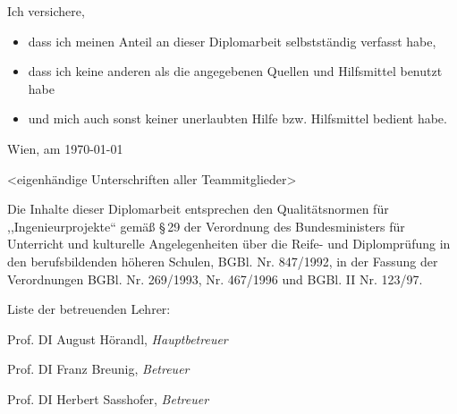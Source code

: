 \documentclass[a4paper,ngerman,naustrian,DIV=12,BCOR=1cm]{scrbook}
\begin{document}

\thispagestyle{fancy}





\thispagestyle{fancy}





\thispagestyle{fancy}

Ich versichere, 
\begin{itemize}
\item dass ich meinen Anteil an dieser Diplomarbeit selbstständig verfasst
habe, 
\item dass ich keine anderen als die angegebenen Quellen und Hilfsmittel
benutzt habe 
\item und mich auch sonst keiner unerlaubten Hilfe bzw. Hilfsmittel bedient
habe.
\end{itemize}
\bigskip{}
Wien, am \today

<eigenhändige Unterschriften aller Teammitglieder>



\thispagestyle{fancy}

Die Inhalte dieser Diplomarbeit entsprechen den Qualitätsnormen für
,,Ingenieurprojekte`` gemäß §\,29 der Verordnung des Bundesministers
für Unterricht und kulturelle Angelegenheiten über die Reife- und
Diplomprüfung in den berufsbildenden höheren Schulen, BGBl. Nr. 847/1992,
in der Fassung der Verordnungen BGBl. Nr. 269/1993, Nr. 467/1996 und
BGBl. II Nr. 123/97.

\vspace{10mm}


Liste der betreuenden Lehrer: 

Prof. DI August Hörandl, \textit{Hauptbetreuer}

Prof. DI Franz Breunig, \textit{Betreuer}

Prof. DI Herbert Sasshofer, \textit{Betreuer}

\vspace{10mm}

\renewcommand*{\chapterpagestyle}{fancy}
\cleardoublepage{}
\tableofcontents{}
\cleardoublepage{}
\listoftables
\cleardoublepage{}
\listoffigures
\end{document}
